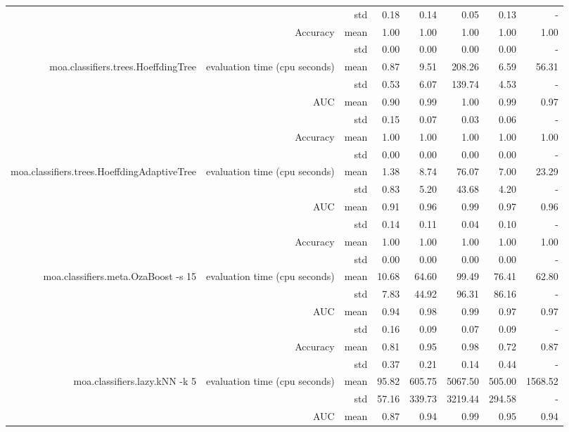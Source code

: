 \documentclass{article}
\begin{document}
\begin{table}[htbp]
\begin{tabular}{rrrrrrrr}
 & & std & 0.18 & 0.14 & 0.05 & 0.13 & -\\
&\multirow{2}[4]{*}{Accuracy} & mean & 1.00 & 1.00 & 1.00 & 1.00& 1.00\\
 & & std & 0.00 & 0.00 & 0.00 & 0.00 & -\\
\multirow{6}[6]{*}{moa.classifiers.trees.HoeffdingTree}&\multirow{2}[4]{*}{evaluation time (cpu seconds)} & mean & 0.87 & 9.51 & 208.26 & 6.59& 56.31\\
 & & std & 0.53 & 6.07 & 139.74 & 4.53 & -\\
&\multirow{2}[4]{*}{AUC} & mean & 0.90 & 0.99 & 1.00 & 0.99& 0.97\\
 & & std & 0.15 & 0.07 & 0.03 & 0.06 & -\\
&\multirow{2}[4]{*}{Accuracy} & mean & 1.00 & 1.00 & 1.00 & 1.00& 1.00\\
 & & std & 0.00 & 0.00 & 0.00 & 0.00 & -\\
\multirow{6}[6]{*}{moa.classifiers.trees.HoeffdingAdaptiveTree}&\multirow{2}[4]{*}{evaluation time (cpu seconds)} & mean & 1.38 & 8.74 & 76.07 & 7.00& 23.29\\
 & & std & 0.83 & 5.20 & 43.68 & 4.20 & -\\
&\multirow{2}[4]{*}{AUC} & mean & 0.91 & 0.96 & 0.99 & 0.97& 0.96\\
 & & std & 0.14 & 0.11 & 0.04 & 0.10 & -\\
&\multirow{2}[4]{*}{Accuracy} & mean & 1.00 & 1.00 & 1.00 & 1.00& 1.00\\
 & & std & 0.00 & 0.00 & 0.00 & 0.00 & -\\
\multirow{6}[6]{*}{moa.classifiers.meta.OzaBoost -s 15}&\multirow{2}[4]{*}{evaluation time (cpu seconds)} & mean & 10.68 & 64.60 & 99.49 & 76.41& 62.80\\
 & & std & 7.83 & 44.92 & 96.31 & 86.16 & -\\
&\multirow{2}[4]{*}{AUC} & mean & 0.94 & 0.98 & 0.99 & 0.97& 0.97\\
 & & std & 0.16 & 0.09 & 0.07 & 0.09 & -\\
&\multirow{2}[4]{*}{Accuracy} & mean & 0.81 & 0.95 & 0.98 & 0.72& 0.87\\
 & & std & 0.37 & 0.21 & 0.14 & 0.44 & -\\
\multirow{6}[6]{*}{moa.classifiers.lazy.kNN -k 5}&\multirow{2}[4]{*}{evaluation time (cpu seconds)} & mean & 95.82 & 605.75 & 5067.50 & 505.00& 1568.52\\
 & & std & 57.16 & 339.73 & 3219.44 & 294.58 & -\\
&\multirow{2}[4]{*}{AUC} & mean & 0.87 & 0.94 & 0.99 & 0.95& 0.94\\

\end{tabular}
\end{table}
\end{document}
